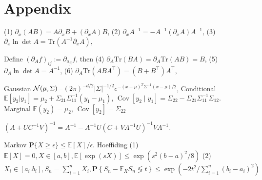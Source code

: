 \section{Appendix}
\begin{footnotesize}
    (1) $\partial_x (AB) = A\partial_x B+(\partial_x A)B$, 
    (2) $\partial_x A^{-1} = -A^{-1}(\partial_x A)A^{-1}$, 
    (3) $\partial_x\ln\det A = \mathrm{Tr}\left(A^{-1}\partial_x A\right)$,
    
    Define $(\partial_A f)_{ij}:=\partial_{a_{ji}} f$, then
    (4) $\partial_A\mathrm{Tr}(BA) = \partial_A\mathrm{Tr}(AB) = B$,
    (5) $\partial_A\ln\det A=A^{-1}$,
    (6) $\partial_A\mathrm{Tr}(ABA^{\top}) = (B+B^{\top})A^{\top}$,
    
    Gaussian $\mathcal{N}(\mu,\Sigma)$=$(2\pi)^{-d/2}|\Sigma|^{-1/2}e^{-(x-\mu)^T \Sigma^{-1} (x-\mu)/2}$, 
    Conditional $\mathbb{E} [y_2 | y_1] = \mu_2+\Sigma_{21}\Sigma_{11}^{-1} (y_1-\mu_1)$, $\operatorname{Cov}[y_2\mid y_1] = \Sigma_{22} - \Sigma_{21}\Sigma_{11}^{-1}\Sigma_{12}$. \\
    Marginal $\mathbb{E} (y_2 ) = \mu_2$, $\operatorname{Cov}[y_2] = \Sigma_{22}$
    
    $(A + U C^{-1} V)^{-1} = A^{-1} - A^{-1}U(C+VA^{-1}U)^{-1}V A^{-1}$.

    Markov $\mathbf{P}\{X \geq \epsilon\} \leq {\mathbb{E}[X]}/{\epsilon}$. Hoeffiding (1) $\mathbb{E}[X] = 0, X\in[a,b], \mathbb{E}[\exp (s X)] \leq \exp \left(s^{2}(b-a)^{2} / 8\right)$ (2) $X_i \in [a_i. b_i], S_{n}=\sum_{i=1}^{n} X_{i},\mathbf{P}\left\{S_{n}-\mathbb{E}_{X} S_{n} \lessgtr  t\right\} \leq \exp \left(-{2 t^{2}} / {\sum_{i=1}^{n}\left(b_{i}-a_{i}\right)^{2}}\right)$
\end{footnotesize}




